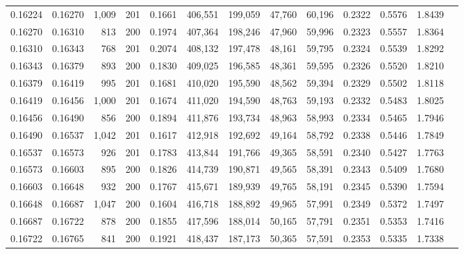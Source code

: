 \begin{tabular}{rrrrrrrrrrrrr}
0.16224 & 0.16270 & 1,009 & 201 &                                     0.1661 & 406,551 & 199,059 &  47,760 &  60,196 & 0.2322 & 0.5576 & 1.8439 \\
0.16270 & 0.16310 &   813 & 200 &                                     0.1974 & 407,364 & 198,246 &  47,960 &  59,996 & 0.2323 & 0.5557 & 1.8364 \\
0.16310 & 0.16343 &   768 & 201 &                                     0.2074 & 408,132 & 197,478 &  48,161 &  59,795 & 0.2324 & 0.5539 & 1.8292 \\
0.16343 & 0.16379 &   893 & 200 &                                     0.1830 & 409,025 & 196,585 &  48,361 &  59,595 & 0.2326 & 0.5520 & 1.8210 \\
0.16379 & 0.16419 &   995 & 201 &                                     0.1681 & 410,020 & 195,590 &  48,562 &  59,394 & 0.2329 & 0.5502 & 1.8118 \\
0.16419 & 0.16456 & 1,000 & 201 &                                     0.1674 & 411,020 & 194,590 &  48,763 &  59,193 & 0.2332 & 0.5483 & 1.8025 \\
0.16456 & 0.16490 &   856 & 200 &                                     0.1894 & 411,876 & 193,734 &  48,963 &  58,993 & 0.2334 & 0.5465 & 1.7946 \\
0.16490 & 0.16537 & 1,042 & 201 &                                     0.1617 & 412,918 & 192,692 &  49,164 &  58,792 & 0.2338 & 0.5446 & 1.7849 \\
0.16537 & 0.16573 &   926 & 201 &                                     0.1783 & 413,844 & 191,766 &  49,365 &  58,591 & 0.2340 & 0.5427 & 1.7763 \\
0.16573 & 0.16603 &   895 & 200 &                                     0.1826 & 414,739 & 190,871 &  49,565 &  58,391 & 0.2343 & 0.5409 & 1.7680 \\
0.16603 & 0.16648 &   932 & 200 &                                     0.1767 & 415,671 & 189,939 &  49,765 &  58,191 & 0.2345 & 0.5390 & 1.7594 \\
0.16648 & 0.16687 & 1,047 & 200 &                                     0.1604 & 416,718 & 188,892 &  49,965 &  57,991 & 0.2349 & 0.5372 & 1.7497 \\
0.16687 & 0.16722 &   878 & 200 &                                     0.1855 & 417,596 & 188,014 &  50,165 &  57,791 & 0.2351 & 0.5353 & 1.7416 \\
0.16722 & 0.16765 &   841 & 200 &                                     0.1921 & 418,437 & 187,173 &  50,365 &  57,591 & 0.2353 & 0.5335 & 1.7338 \\

\end{tabular}
